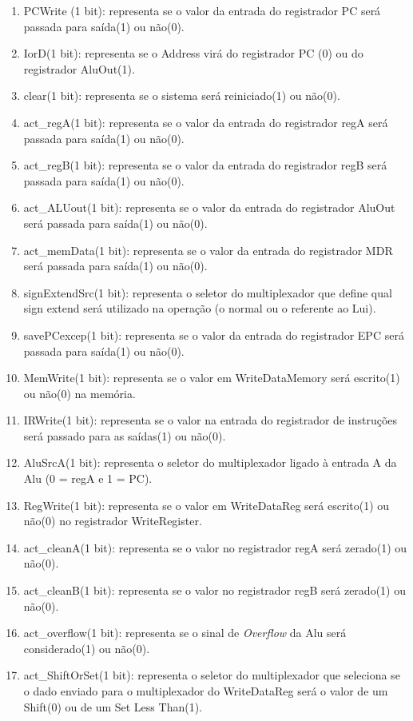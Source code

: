 \documentclass{article}
\begin{document}
    \begin{enumerate}
        \item PCWrite (1 bit): representa se o valor da entrada do registrador PC será passada para saída(1) ou não(0).
        \item IorD(1 bit): representa se o Address virá do registrador PC (0) ou do registrador AluOut(1).
        \item clear(1 bit): representa se o sistema será reiniciado(1) ou não(0).
        \item act\_regA(1 bit): representa se o valor da entrada do registrador regA será passada para saída(1) ou não(0).
        \item act\_regB(1 bit): representa se o valor da entrada do registrador regB será passada para saída(1) ou não(0).
        \item act\_ALUout(1 bit): representa se o valor da entrada do registrador AluOut será passada para saída(1) ou não(0).
        \item act\_memData(1 bit): representa se o valor da entrada do registrador MDR será passada para saída(1) ou não(0).
        \item signExtendSrc(1 bit): representa o seletor do multiplexador que define qual sign extend será utilizado na operação (o normal ou o referente ao Lui).
        \item savePCexcep(1 bit): representa se o valor da entrada do registrador EPC será passada para saída(1) ou não(0).
        \item MemWrite(1 bit): representa se o valor em WriteDataMemory será escrito(1) ou não(0) na memória.
        \item IRWrite(1 bit): representa se o valor na entrada do registrador de instruções será passado para as saídas(1) ou não(0).
        \item AluSrcA(1 bit): representa o seletor do multiplexador ligado à entrada A da Alu (0 = regA e 1 = PC).
        \item RegWrite(1 bit): representa se o valor em WriteDataReg será escrito(1) ou não(0) no registrador WriteRegister.
        \item act\_cleanA(1 bit): representa se o valor no registrador regA será zerado(1) ou não(0).
        \item act\_cleanB(1 bit): representa se o valor no registrador regB será zerado(1) ou não(0).
        \item act\_overflow(1 bit): representa se o sinal de {\it Overflow} da Alu será considerado(1) ou não(0).
        \item act\_ShiftOrSet(1 bit): representa o seletor do multiplexador que seleciona se o dado enviado para o multiplexador do WriteDataReg será o valor de um Shift(0) ou de um Set Less Than(1).

\end{enumerate}
\end{document}
